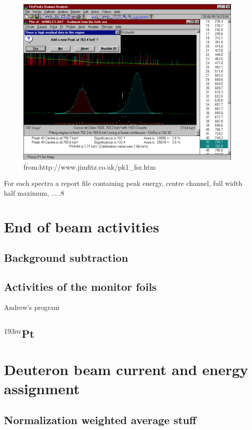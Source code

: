 \begin{figure}
    \centering
    \includegraphics[width=18cm]{Analysis/fitz_example.png}
    \caption{from:http://www.jimfitz.co.uk/pk1_fsz.htm}
    \label{fig:fitz_example}
\end{figure}

\noindent For each spectra a report file containing peak energy, centre channel, full width half maximum, .....8

\section{End of beam activities}
\subsection{Background subtraction}
\subsection{Activities of the monitor foils}
Andrew's program
\subsection{$^{193m}$Pt}
\section{Deuteron beam current and energy assignment} \label{sec:beamcurrent}
\subsection{Normalization weighted average stuff}
